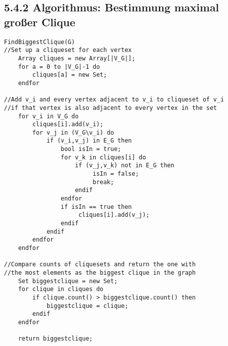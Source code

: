 \subsection*{5.4.2 Algorithmus: Bestimmung maximal großer Clique}
\begin{lstlisting}
FindBiggestClique(G)
//Set up a cliqueset for each vertex
    Array cliques = new Array[|V_G|];
    for a = 0 to |V_G|-1 do
        cliques[a] = new Set;
    endfor
    
//Add v_i and every vertex adjacent to v_i to cliqueset of v_i
//if that vertex is also adjacent to every vertex in the set
    for v_i in V_G do
        cliques[i].add(v_i);
        for v_j in (V_G\v_i) do
            if (v_i,v_j) in E_G then
                bool isIn = true;
                for v_k in cliques[i] do
                    if (v_j,v_k) not in E_G then
                	     isIn = false;
                	     break;
                    endif
                endfor
                if isIn == true then
                     cliques[i].add(v_j);
                endif
            endif
        endfor
    endfor
    
//Compare counts of cliquesets and return the one with
//the most elements as the biggest clique in the graph
    Set biggestclique = new Set;
    for clique in cliques do
        if clique.count() > biggestclique.count() then
            biggestclique = clique;
        endif
    endfor
    
    return biggestclique;
\end{lstlisting}
